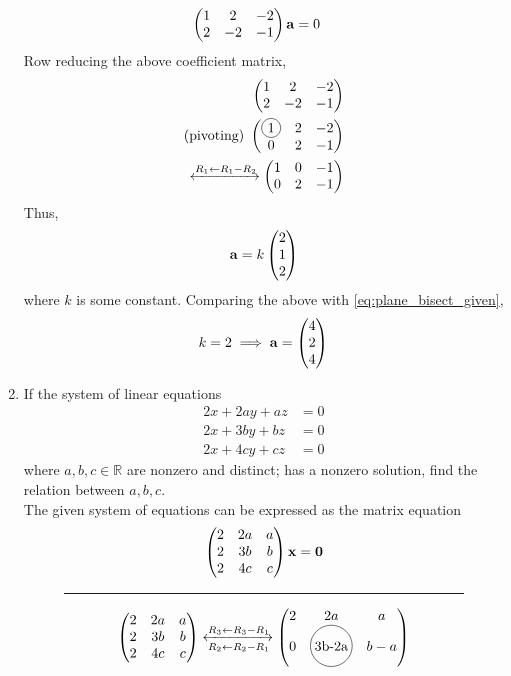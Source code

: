 \documentclass[journal,12pt,twocolumn]{IEEEtran}
\renewcommand\thesection{\arabic{section}}
\begin{document}
\begin{enumerate}[label=\thesection.\arabic*.,ref=\thesection.\theenumi]
\begin{align}
	\begin{pmatrix}1 & 2 & -2 \\
	2 & -2 & -1\end{pmatrix}\mathbf{a} &=0
\end{align}
Row reducing the above coefficient matrix, 
\begin{align}
	\myvec{1 & 2 & -2 \\ 2 & -2 & -1}
	\\
	\text{(pivoting) }	\myvec{\circled{1} & 2 & -2 \\ 0 & 2  & -1}
	\\
	\xleftrightarrow[]{R_1\leftarrow R_1 - R_2}	\myvec{1 & 0 & -1 \\ 0 & 2  & -1}
\end{align}
Thus, 
\begin{align}
	\mathbf{a} = k\begin{pmatrix}2 \\ 1 \\ 2\end{pmatrix}
\end{align}
where $k$ is some constant.  Comparing the above with 
	\eqref{eq:plane_bisect_given},
\begin{align}
	k = 2 \implies 
	\mathbf{a} = \begin{pmatrix}4 \\ 2 \\ 4\end{pmatrix}
\end{align}
	\item If the system of linear equations 
\begin{align}
	2x + 2ay + az & = 0
	\\
	2x + 3by + bz & = 0
	\\
	2x + 4cy + cz & = 0
\end{align}
where $a, b, c \in \mathbb{R}$ are nonzero and distinct; has a nonzero solution, find the relation between $a,b,c$.
\\
\solution The given system of equations can be expressed as the matrix equation
\begin{align}
	\begin{pmatrix}2 & 2a & a 
	\\
	2 & 3b & b
	\\
	2 & 4c & c\end{pmatrix} \mathbf{x} = \mathbf{0}
\end{align}
\begin{figure}[!hb]
	\centering
		\hrule
\begin{align}
	\label{eq:matrix_hp_begin}
	\myvec{2 & 2a & a 
	\\
	2 & 3b & b
	\\
	2 & 4c & c} 
\xleftrightarrow[R_2\leftarrow R_2 - R_1]{R_3\leftarrow R_3 - R_1}
	\myvec{2 & 2a & a 
	\\
	0 & \circled{3b-2a} & b-a
	\\
}
\end{align}
\end{figure}
\end{enumerate}
\end{document}
